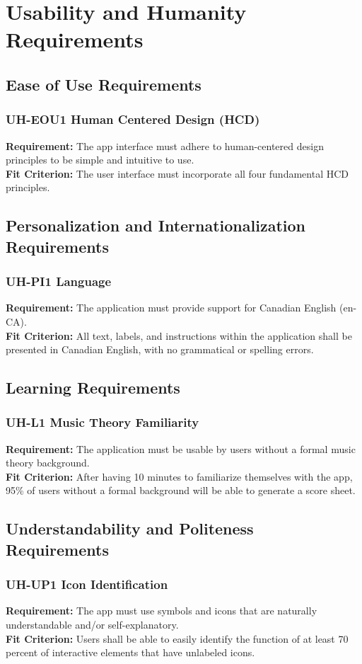 \documentclass[12pt]{article}
\begin{document}
\section{Usability and Humanity Requirements}
\subsection{Ease of Use Requirements}
\subsubsection*{UH-EOU1 Human Centered Design (HCD)}
\textbf{Requirement:} The app interface must adhere to human-centered design principles to be simple and intuitive to use.\\
\textbf{Fit Criterion:} The user interface must incorporate all four fundamental HCD principles.
\subsection{Personalization and Internationalization Requirements}
\subsubsection*{UH-PI1 Language}
\textbf{Requirement:} The application must provide support for Canadian English (en-CA).\\
\textbf{Fit Criterion:} All text, labels, and instructions within the application 
shall be presented in Canadian English, with no grammatical or spelling errors.
\subsection{Learning Requirements}
\subsubsection*{UH-L1 Music Theory Familiarity}
\textbf{Requirement:} The application must be usable by users without a formal music theory background. \\
\textbf{Fit Criterion:} After having 10 minutes to familiarize themselves with the app, 95\% of users without a 
formal background will be able to generate a score sheet.
\subsection{Understandability and Politeness Requirements}
\subsubsection*{UH-UP1 Icon Identification}
\textbf{Requirement:} The app must use symbols and icons that are naturally understandable and/or self-explanatory.\\
\textbf{Fit Criterion:} Users shall be able to easily identify the function of at least 70 percent of interactive elements
that have unlabeled icons.
\end{document}
